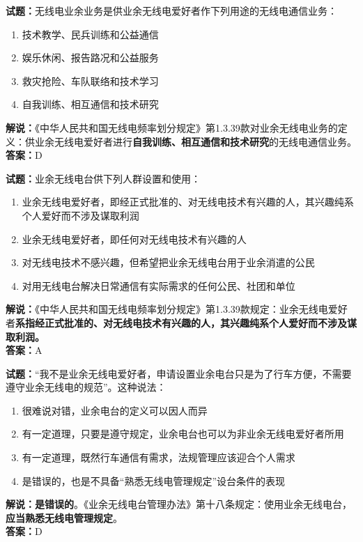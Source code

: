 \documentclass{ctexbook}
\begin{document}
\bigskip

\noindent\textbf{试题：}无线电业余业务是供业余无线电爱好者作下列用途的无线电通信业务：
\begin{enumerate}[leftmargin=3em]
  \item 技术教学、民兵训练和公益通信
  \item 娱乐休闲、报告路况和公益服务
  \item 救灾抢险、车队联络和技术学习
  \item 自我训练、相互通信和技术研究
\end{enumerate}
\noindent\textbf{解说：}《中华人民共和国无线电频率划分规定》第1.3.39款对业余无线电业务的定义：供业余无线电爱好者进行\textbf{自我训练、相互通信和技术研究}的无线电通信业务。\\\noindent\textbf{答案：}D

\bigskip

\noindent\textbf{试题：}业余无线电台供下列人群设置和使用：
\begin{enumerate}[leftmargin=3em]
  \item 业余无线电爱好者，即经正式批准的、对无线电技术有兴趣的人，其兴趣纯系个人爱好而不涉及谋取利润
  \item 业余无线电爱好者，即任何对无线电技术有兴趣的人
  \item 对无线电技术不感兴趣，但希望把业余无线电台用于业余消遣的公民
  \item 对用无线电台解决日常通信有实际需求的任何公民、社团和单位
\end{enumerate}
\noindent\textbf{解说：}《中华人民共和国无线电频率划分规定》第1.3.39款规定：业余无线电爱好者\textbf{系指经正式批准的、对无线电技术有兴趣的人，其兴趣纯系个人爱好而不涉及谋取利润。}\\\noindent\textbf{答案：}A

\bigskip

\noindent\textbf{试题：}“我不是业余无线电爱好者，申请设置业余电台只是为了行车方便，不需要遵守业余无线电的规范”。这种说法：
\begin{enumerate}[leftmargin=3em]
  \item 很难说对错，业余电台的定义可以因人而异
  \item 有一定道理，只要是遵守规定，业余电台也可以为非业余无线电爱好者所用
  \item 有一定道理，既然行车通信有需求，法规管理应该迎合个人需求
  \item 是错误的，也是不具备“熟悉无线电管理规定”设台条件的表现
\end{enumerate}
\noindent\textbf{解说：}\textbf{是错误的}。《业余无线电台管理办法》第十八条规定：使用业余无线电台，\textbf{应当熟悉无线电管理规定}。\\\noindent\textbf{答案：}D
\end{document}
